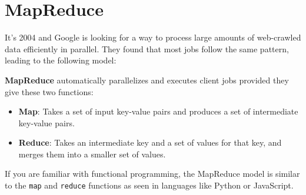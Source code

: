 \newpage
\section{MapReduce}

\noindent
It's 2004 and Google is looking for a way to process large amounts of web-crawled data efficiently in parallel.
They found that most jobs follow the same pattern, leading to the following model:
\begin{Def}[MapReduce]

    \textbf{MapReduce} automatically parallelizes and executes client jobs provided they give these two functions:
    \begin{itemize}
        \item \textbf{Map}: Takes a set of input key-value pairs and produces a set of intermediate key-value pairs.
        \item \textbf{Reduce}: Takes an intermediate key and a set of values for that key, and merges them into a smaller set of values.
    \end{itemize}
\end{Def}

\begin{Note}
    If you are familiar with functional programming, the MapReduce model is similar to the \texttt{map} and \texttt{reduce} functions as seen in languages like Python or JavaScript.
\end{Note}


